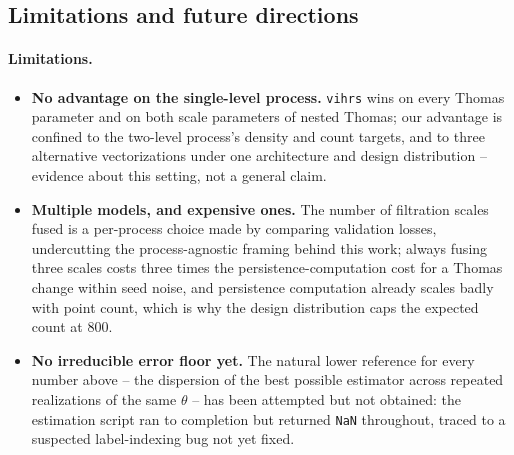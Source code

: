 \documentclass[11pt,a4paper]{article}
\theoremstyle{definitioncolon}
\begin{document}
\subsection{Limitations and future directions}
\label{paramnet:sec-future}

\paragraph{Limitations.}
\begin{itemize}[leftmargin=*,itemsep=1pt,topsep=2pt]
\item \textbf{No advantage on the single-level process.} \texttt{vihrs}
    wins on every Thomas parameter and on both scale parameters of nested
    Thomas; our advantage is confined to the two-level process's density
    and count targets, and to three alternative vectorizations under one
    architecture and design distribution -- evidence about this setting,
    not a general claim.
\item \textbf{Multiple models, and expensive ones.} The number of
    filtration scales fused is a per-process choice made by comparing
    validation losses, undercutting the process-agnostic framing behind
    this work; always fusing three scales costs three times the
    persistence-computation cost for a Thomas change within seed noise, and
    persistence computation already scales badly with point count, which is
    why the design distribution caps the expected count at 800.
\item \textbf{No irreducible error floor yet.} The natural lower reference
    for every number above -- the dispersion of the best possible estimator
    across repeated realizations of the same $\theta$ -- has been attempted
    but not obtained: the estimation script ran to completion but returned
    \texttt{NaN} throughout, traced to a suspected label-indexing bug not
    yet fixed.
\end{itemize}
\end{document}
